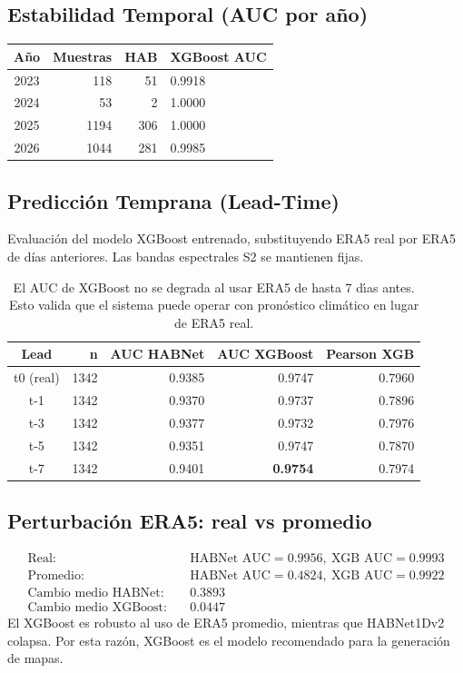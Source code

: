 \documentclass[12pt]{article}
\begin{document}
\subsection{Estabilidad Temporal (AUC por a\~no)}
\begin{table}[H]
\centering
\begin{tabular}{crrl}
\toprule
A\~no & Muestras & HAB & XGBoost AUC \\
\midrule
2023 & 118 & 51 & 0.9918 \\
2024 & 53 & 2 & 1.0000 \\
2025 & 1194 & 306 & 1.0000 \\
2026 & 1044 & 281 & 0.9985 \\
\bottomrule
\end{tabular}
\end{table}

\subsection{Predicci\'on Temprana (Lead-Time)}
Evaluaci\'on del modelo XGBoost entrenado, substituyendo ERA5 real por ERA5 de d\'ias anteriores. Las bandas espectrales S2 se mantienen fijas.

\begin{table}[H]
\centering
\begin{tabular}{crrrr}
\toprule
Lead & n & AUC HABNet & AUC XGBoost & Pearson XGB \\
\midrule
t0 (real) & 1342 & 0.9385 & 0.9747 & 0.7960 \\
t-1 & 1342 & 0.9370 & 0.9737 & 0.7896 \\
t-3 & 1342 & 0.9377 & 0.9732 & 0.7976 \\
t-5 & 1342 & 0.9351 & 0.9747 & 0.7870 \\
t-7 & 1342 & 0.9401 & \textbf{0.9754} & 0.7974 \\
\bottomrule
\end{tabular}
\caption{El AUC de XGBoost no se degrada al usar ERA5 de hasta 7 d\'{\i}as antes. Esto valida que el sistema puede operar con pron\'ostico clim\'atico en lugar de ERA5 real.}
\end{table}

\subsection{Perturbaci\'on ERA5: real vs promedio}
\begin{align*}
\text{Real:} &\quad \text{HABNet AUC}=0.9956,\ \text{XGB AUC}=0.9993 \\
\text{Promedio:} &\quad \text{HABNet AUC}=0.4824,\ \text{XGB AUC}=0.9922 \\
\text{Cambio medio HABNet:} &\quad 0.3893 \\
\text{Cambio medio XGBoost:} &\quad 0.0447
\end{align*}
El XGBoost es robusto al uso de ERA5 promedio, mientras que HABNet1Dv2 colapsa. Por esta raz\'on, XGBoost es el modelo recomendado para la generaci\'on de mapas.
\end{document}

